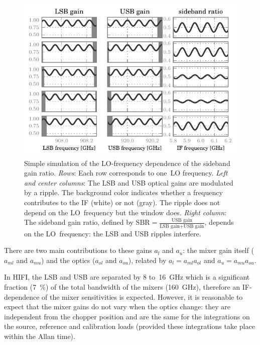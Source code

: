 \begin{figure}[bp]
    \centering
    \includegraphics{lo_scan_of_ripple}
    \caption{
        Simple simulation of the LO-frequency dependence of the sideband gain ratio.
        \emph{Rows}:
            Each row corresponds to one~LO frequency.
        \emph{Left and center columns}:
            The LSB and USB optical gains are modulated by a ripple.
            The background color indicates whether a frequency
            contributes to the IF (white) or not (gray).
            The ripple does not depend on the LO~frequency but the window does.
        \emph{Right column}:
            The sideband gain ratio,
            defined by
            $\text{SBR}=\frac{\text{USB gain}}{\text{LSB gain}+\text{USB gain}}$,
            depends on the LO~frequency:
            the LSB and USB ripples interfere.
    }
    \label{fig:lo_scan_of_ripple}
\end{figure}

There are two main contributions to these gains $a_l$ and $a_u$:
the mixer gain itself ($a_{ml}$ and $a_{mu}$)
and the optics ($a_{ol}$ and $a_{ou}$), related by
$a_l = a_{ml} a_{ol}$ and $a_u = a_{mu} a_{ou}$.

In HIFI, the LSB and USB are separated by \num{8} to~\SI{16}{\giga\hertz}
which is a significant fraction (\SI{7}{\percent}) of the total bandwidth of the mixers (\SI{160}{\giga\hertz}),
therefore an IF-dependence of the mixer sensitivities is expected.
However, it is reasonable to expect that the mixer gains do not vary when the optics change: they are independent from the chopper position and are the same for the integrations on the source, reference and calibration loads (provided these integrations take place within the Allan time).

